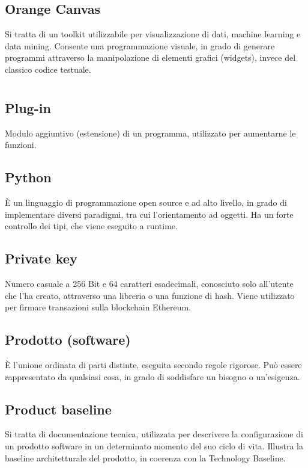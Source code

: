 	\subsection*{Orange Canvas}
	Si tratta di un toolkit utilizzabile per visualizzazione di dati, machine learning e data mining. Consente una programmazione visuale, in grado di generare programmi attraverso la manipolazione di elementi grafici (widgets), invece del classico codice testuale.
\pagebreak
\section[P]{}
	\subsection*{Plug-in}
	Modulo aggiuntivo (estensione) di un programma, utilizzato per aumentarne le funzioni.
	\subsection*{Python}
	È un linguaggio di programmazione open source e ad alto livello, in grado di implementare diversi paradigmi, tra cui l’orientamento ad oggetti. Ha un forte controllo dei tipi, che viene eseguito a runtime.
	\subsection*{Private key}
	Numero casuale a 256 Bit e 64 caratteri esadecimali, conosciuto solo all’utente che l’ha creato, attraverso una libreria o una funzione di hash. Viene utilizzato per firmare transazioni sulla blockchain Ethereum.
	\subsection*{Prodotto (software)}
	È l’unione ordinata di parti distinte, eseguita secondo regole rigorose. Può essere rappresentato da qualsiasi cosa, in grado di soddisfare un bisogno o un’esigenza.
	\subsection*{Product baseline}
	Si tratta di documentazione tecnica, utilizzata per descrivere la configurazione di un prodotto software in un determinato momento del suo ciclo di vita. Illustra la baseline architetturale del prodotto, in coerenza con la Technology Baseline.
